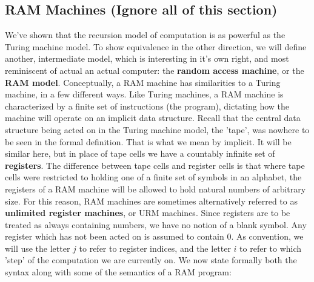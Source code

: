 \subsection{RAM Machines (Ignore all of this section)}
We've shown that the recursion model of computation is as powerful as the Turing machine model. To show equivalence in the other direction, we will define another, intermediate model, which is interesting in it's own right, and most reminiscent of actual an actual computer: the \textbf{random access machine}, or the \textbf{RAM model}. Conceptually, a RAM machine has similarities to a Turing machine, in a few different ways. Like Turing machines, a RAM machine is characterized by a finite set of instructions (the program), dictating how the machine will operate on an implicit data structure. Recall that the central data structure being acted on in the Turing machine model, the 'tape', was nowhere to be seen in the formal definition. That is what we mean by implicit. It will be similar here, but in place of tape cells we have a countably infinite set of \textbf{registers}. The difference between tape cells and register cells is that where tape cells were restricted to holding one of a finite set of symbols in an alphabet, the registers of a RAM machine will be allowed to hold natural numbers of arbitrary size. For this reason, RAM machines are sometimes alternatively referred to as \textbf{unlimited register machines}, or URM machines. Since registers are to be treated as always containing numbers, we have no notion of a blank symbol. Any register which has not been acted on is assumed to contain $0$. As convention, we will use the letter $j$ to refer to register indices, and the letter $i$ to refer to which 'step' of the computation we are currently on. We now state formally both the syntax along with some of the semantics of a RAM program:
